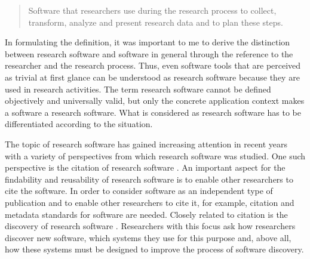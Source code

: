 \documentclass[12pt, a4paper, titlepage, oneside, abstract=true, toc=listof, toc=bibliography, BCOR=1cm]{scrreprt}
\begin{document}
\begin{quotation}
Software that researchers use during the research process to collect, transform, analyze and present research data and to plan these steps.
\end{quotation}

In formulating the definition, it was important to me to derive the distinction between research software and software in general through the reference to the researcher and the research process. Thus, even software tools that are perceived as trivial at first glance can be understood as research software because they are used in research activities. The term research software cannot be defined objectively and universally valid, but only the concrete application context makes a software a research software. What is considered as research software has to be differentiated according to the situation. 

The topic of research software has gained increasing attention in recent years with a variety of perspectives from which research software was studied. 
One such perspective is the citation of research software \citep[e.g.][]{Allen2020, Cosmo2020, Druskat2020, Katz2020, Nielsen2019, Niemeyer2016, Soito2017}. An important aspect for the findability and reusability of research software is to enable other researchers to cite the software. In order to consider software as an independent type of publication and to enable other researchers to cite it, for example, citation and metadata standards for software are needed.
Closely related to citation is the discovery of research software \citep[e.g.][]{Howison2015, Hucka2018, MurphyHill2015, Struck2018}. Researchers with this focus ask how researchers discover new software, which systems they use for this purpose and, above all, how these systems must be designed to improve the process of software discovery. 
\end{document}
